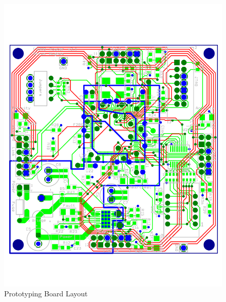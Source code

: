 \begin{figure}[ptb]
	\begin{centering}
		\includegraphics[width=6in]{Hardware/Figures/hardware-layout.pdf}
		\caption{Prototyping Board Layout}
		\label{fig:hardware:layout}
	\end{centering}
\end{figure}

